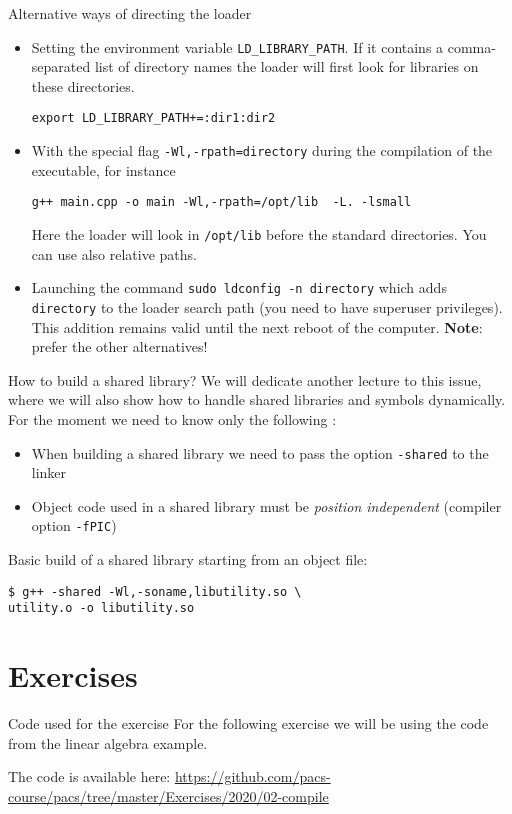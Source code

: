 \documentclass[10pt]{beamer}
\begin{document}
\begin{frame}[fragile]{Alternative ways of directing the loader}
\begin{itemize}
\item Setting the environment variable \texttt{LD\_LIBRARY\_PATH}. If
it contains a comma-separated list of directory names the
loader will first look for libraries on these directories.
\begin{verbatim}
export LD_LIBRARY_PATH+=:dir1:dir2
\end{verbatim}
\item With the special flag \texttt{-Wl,-rpath=directory}
during the compilation of the executable, for instance
\begin{verbatim}
g++ main.cpp -o main -Wl,-rpath=/opt/lib  -L. -lsmall
\end{verbatim}
Here the loader will look in \texttt{/opt/lib} before the standard directories. You can use also relative paths.
\item Launching the command \texttt{sudo ldconfig -n directory} which adds \texttt{directory} to the loader search path (you need to have superuser privileges). This addition remains valid until the next reboot of the computer. \textbf{Note}: prefer the other alternatives!
\end{itemize}
\end{frame}

\begin{frame}[fragile]{How to build a shared library?}
We will dedicate another lecture to this issue, where we will also show how to handle shared libraries and symbols dynamically.
For the moment we need to know only the following :
\begin{itemize}
\item When building a shared library we need to pass the option \texttt{-shared} to the linker
\item Object code used in a shared library must be \emph{position independent} (compiler option \texttt{-fPIC})
\end{itemize}

Basic build of a shared library starting from an object file:
\begin{verbatim}
$ g++ -shared -Wl,-soname,libutility.so \
utility.o -o libutility.so
\end{verbatim}
\end{frame}


\section{Exercises}
\begin{frame}{Code used for the exercise}
For the following exercise we will be using the code from the linear algebra example.

The code is available here: \url{https://github.com/pacs-course/pacs/tree/master/Exercises/2020/02-compile}
\end{frame}
\end{document}
